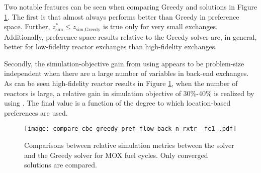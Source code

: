 Two notable features can be seen when comparing Greedy and \cbc solutions in
Figure \ref{fig:compare_cbc_greedy_pref_flow_back_n_rxtr__fc1_}. The first is
that \cbc almost always performs better than Greedy in preference space. Further,
$z^*_{\text{sim}} \leq z_{\text{sim}, \text{Greedy}}$ is true only for very
small exchanges. Additionally, \cbc preference space results relative to the
Greedy solver are, in general, better for low-fidelity reactor exchanges than
high-fidelity exchanges.

Secondly, the simulation-objective gain from using \cbc appears to be
problem-size independent when there are a large number of variables in back-end
exchanges. As can be seen high-fidelity reactor results in Figure
\ref{fig:compare_cbc_greedy_pref_flow_back_n_rxtr__fc1_}, when the number of
reactors is large, a relative gain in simulation objective of 30\%-40\% is
realized by using \cbc. The final value is a function of the degree to which
location-based preferences are used.

\begin{figure}[h!]
  \begin{center}
    \texttt{[image: compare\_cbc\_greedy\_pref\_flow\_back\_n\_rxtr\_\_fc1\_.pdf]}
    \caption{
      \label{fig:compare_cbc_greedy_pref_flow_back_n_rxtr__fc1_}
      Comparisons between relative simulation metrics between the \cbc solver and
      the Greedy solver for MOX fuel cycles. Only converged \cbc
      solutions are compared.  }
  \end{center}
\end{figure}
